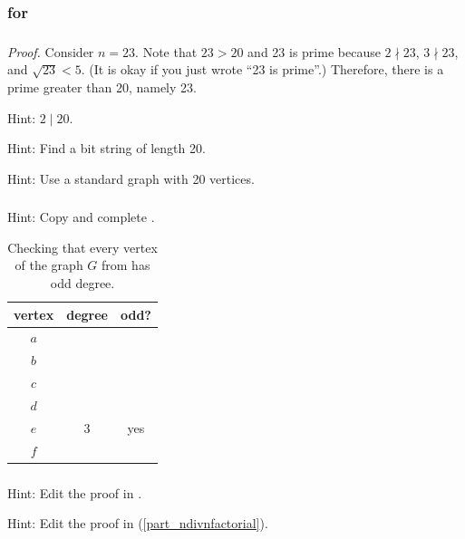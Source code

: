 \subsubsection{\answers for  \subpffquants}

\subsubsection*{ \answers}
\begin{apart}
    \item \emph{Proof.} Consider $n=23$.  Note that $23 > 20$ and 23 is prime because $2 \nmid 23$, $3 \nmid 23$, and $\sqrt{23} < 5$. (It is okay if you just wrote ``23 is prime''.) Therefore, there is a prime greater than 20, namely 23.
    \item Hint: $2 \mid 20$.
    \item Hint: Find a bit string of length 20.
    \item Hint: Use a standard graph with 20 vertices.
\end{apart}

\subsubsection*{ \answers}
Hint: Copy and complete .

\begin{table}[hbtp]
    \centering
    \begin{tabular}{c|c |c}
        vertex & degree & odd? \\ \hline
        $a$ && \\ \hline
        $b$ && \\ \hline
        $c$ && \\ \hline
        $d$ && \\ \hline
        $e$ & 3 & yes \\ \hline
        $f$ && \\ 
    \end{tabular}
    \caption{Checking that every vertex of the graph $G$ from  has odd degree.}
    \label{tab_all_odd_deg}
\end{table}

\subsubsection*{ \answers}
\begin{apart}
    \item Hint: Edit the proof in .
    \item Hint: Edit the proof in  (\ref{part_ndivnfactorial}).
\end{apart}

